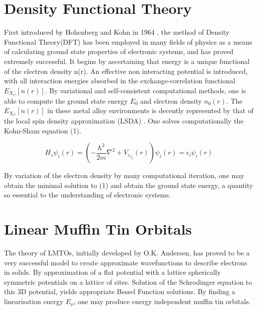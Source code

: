 \documentclass[%
 reprint,
 amsmath,amssymb,
 aps,
]{revtex4-1}
\begin{document}
\section{Density Functional Theory}

First introduced by Hohenberg and Kohn in 1964 \cite{inhom}, the method of Density Functional Theory(DFT) has been employed in many fields of physics as a means of calculating ground state properties of electronic systems, and has proved extremely successful. It begins by ascertaining that energy is a unique functional of the electron density n(r). An effective non interacting potential is introduced, with all interaction energies absorbed in the exchange-correlation functional $E_X_C[n(r)]$. By variational and self-consistent computational methods, one is able to compute the ground state energy $E_0$ and electron density $n_0(r)$. The $E_X_C[n(r)]$ in these metal alloy environments is decently represented by that of the local spin density approximation (LSDA) \cite{exc,inhom}. One solves computationally the Kohn-Sham equation (1).

\begin{equation}
    H_s \psi_i (r) = (-\frac{\hbar^2}{2m}\nabla^2 +V_e_f_f(r) ) \psi_i (r) = \epsilon_i \psi_i (r)
\end{equation}

By variation of the electron density by many computational iteration, one may obtain the minimal solution to (1) and obtain the ground state energy, a quantity so essential to the understanding of electronic systems\cite{martin}.

\section{Linear Muffin Tin Orbitals}

The theory of LMTOs, initially developed by O.K. Andersen\cite{andersen}, has proved to be a very successful model to create approximate wavefunctions to describe electrons in solids. By approximation of a flat potential with a lattice spherically symmetric potentials on a lattice of sites. Solution of the Schrodinger equation to this 3D potential, yields appropriate Bessel Function solutions. By finding a linearisation energy $E_\nu$, one may produce energy independent muffin tin orbitals.

\begin{equation}
    
\end{equation}
\end{document}
